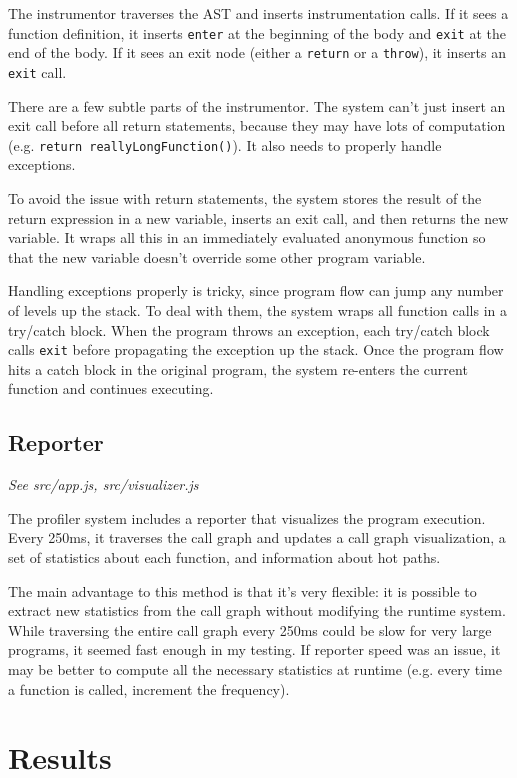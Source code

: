 \documentclass{article}
\begin{document}
The instrumentor traverses the AST and inserts instrumentation calls. If it sees a function definition, it inserts \texttt{enter} at the beginning of the body and \texttt{exit} at the end of the body. If it sees an exit node (either a \texttt{return} or a \texttt{throw}), it inserts an \texttt{exit} call.

There are a few subtle parts of the instrumentor. The system can't just insert an exit call before all return statements, because they may have lots of computation (e.g. \texttt{return reallyLongFunction()}). It also needs to properly handle exceptions.

To avoid the issue with return statements, the system stores the result of the return expression in a new variable, inserts an exit call, and then returns the new variable. It wraps all this in an immediately evaluated anonymous function so that the new variable doesn't override some other program variable.

Handling exceptions properly is tricky, since program flow can jump any number of levels up the stack. To deal with them, the system wraps all function calls in a try/catch block. When the program throws an exception, each try/catch block calls \texttt{exit} before propagating the exception up the stack. Once the program flow hits a catch block in the original program, the system re-enters the current function and continues executing.

\subsection*{Reporter}

\textit{See src/app.js, src/visualizer.js}

The profiler system includes a reporter that visualizes the program execution. Every 250ms, it traverses the call graph and updates a call graph visualization, a set of statistics about each function, and information about hot paths.

The main advantage to this method is that it's very flexible: it is possible to extract new statistics from the call graph without modifying the runtime system. While traversing the entire call graph every 250ms could be slow for very large programs, it seemed fast enough in my testing. If reporter speed was an issue, it may be better to compute all the necessary statistics at runtime (e.g. every time a function is called, increment the frequency). 

\section*{Results}
\end{document}
